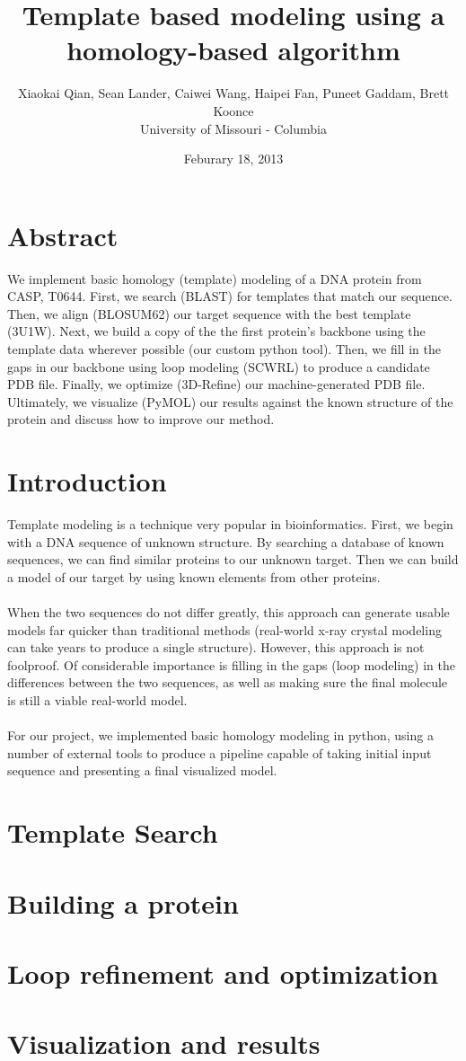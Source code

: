 \documentclass{article}
\title{Template based modeling using a homology-based algorithm}
\author{Xiaokai Qian, Sean Lander, Caiwei Wang, Haipei Fan, Puneet Gaddam, Brett Koonce\\University of Missouri - Columbia}
\date{Feburary 18, 2013}
\begin{document}
\maketitle

\section{Abstract}
We implement basic homology (template) modeling of a DNA protein from CASP, T0644.  First, we search (BLAST) for templates that match our sequence.  Then, we align (BLOSUM62) our target sequence with the best template (3U1W).  Next, we build a copy of the the first protein's backbone using the template data wherever possible (our custom python tool).  Then, we fill in the gaps in our backbone using loop modeling (SCWRL) to produce a candidate PDB file.  Finally, we optimize (3D-Refine) our machine-generated PDB file.  Ultimately, we visualize (PyMOL) our results against the known structure of the protein and discuss how to improve our method.

\section{Introduction}

Template modeling is a technique very popular in bioinformatics.  First, we begin with a DNA sequence of unknown structure.  By searching a database of known sequences, we can find similar proteins to our unknown target.  Then we can build a model of our target by using known elements from other proteins.\\\\
When the two sequences do not differ greatly, this approach can generate usable models far quicker than traditional methods (real-world x-ray crystal modeling can take years to produce a single structure).  However, this approach is not foolproof.  Of considerable importance is filling in the gaps (loop modeling) in the differences between the two sequences, as well as making sure the final molecule is still a viable real-world model.\\\\
For our project, we implemented basic homology modeling in python, using a number of external tools to produce a pipeline capable of taking initial input sequence and presenting a final visualized model.

\section{Template Search}

\section{Building a protein}

\section{Loop refinement and optimization}

\section{Visualization and results}
\end{document}
